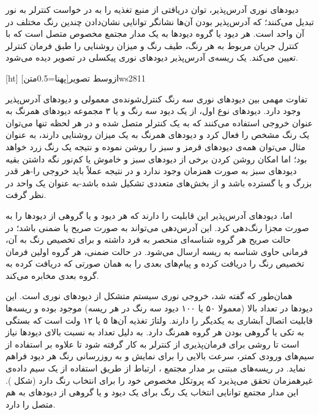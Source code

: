 
دیودهای نوری آدرس‌پذیر، توان دریافتی از منبع تغذیه را به در خواست کنترلر به نور تبدیل می‌کنند؛ که آدرس‌پذیر بودن آن‌ها نشانگر توانایی نشان‌دادن چندین رنگ مختلف در آن واحد است. هر دیود یا گروه دیودها به یک مدار مجتمع مخصوص متصل است که با کنترل جریان مربوط به هر رنگ، طیف رنگ و میزان روشنایی را طبق فرمان کنترلر تعیین می‌کند. یک ریسه‌ی آدرس‌پذیر دیودهای نوری پیکسلی در تصویر  دیده می‌شود.

[ht]
‌ازوسط
‌تصویر[پهنا=0.5‌متن]{ws2811}

تفاوت مهمی بین دیودهای نوری سه رنگ کنترل‌شونده‌ی معمولی و دیودهای آدرس‌پذیر وجود دارد. دیودهای نوع اول، از یک دیود سه رنگ و یا ۳ مجموعه دیودهای همرنگ به عنوان خروجی استفاده می‌کنند که به یک کنترلر متصل شده و در هر لحظه تنها می‌توان یک رنگ مشخص را فعال کرد و دیودهای همرنگ به یک میزان روشنایی دارند، به عنوان مثال می‌توان همه‌ی دیودهای قرمز و سبز را روشن نموده و نتیجه یک رنگ زرد خواهد بود؛ اما امکان روشن کردن برخی از دیود‌های سبز و خاموش یا کم‌نور نگه داشتن بقیه دیودهای سبز به صورت همزمان وجود ندارد و در نتیجه عملاً باید خروجی را-هر قدر بزرگ و یا گسترده باشد و از بخش‌های متعددی تشکیل شده باشد-به عنوان یک واحد در نظر گرفت.

اما، دیودهای آدرس‌پذیر این قابلیت را دارند که هر دیود و یا گروهی از دیود‌ها را به صورت مجزا رنگ‌دهی کرد. این آدرس‌دهی می‌تواند به صورت صریح یا ضمنی باشد؛ در حالت صریح هر گروه شناسه‌ای منحصر به فرد داشته و برای تخصیص رنگ به آن، فرمانی حاوی شناسه به ریسه ارسال می‌شود. در حالت ضمنی، هر گروه اولین فرمان تخصیص رنگ را دریافت کرده و پیام‌های بعدی را به همان صورتی که دریافت کرده به گروه بعدی مخابره می‌کند.


همان‌طور که گفته شد، خروجی نوری سیستم متشکل از دیودهای نوری است. این دیودها در تعداد بالا (معمولا  ۵۰ یا ۱۰۰ دیود سه رنگ در هر ریسه) موجود بوده و ریسه‌ها قابلیت اتصال آبشاری به یکدیگر را دارند. ولتاژ تغذیه آن‌ها ۵ یا ۱۲ ولت است که بستگی به تکی یا گروهی بودن هر گروه همرنگ دارد. به دلیل تعداد به نسبت بالای دیودها نیاز است تا روشی برای فرمان‌پذیری از کنترلر به کار گرفته شود تا علاوه بر استفاده از سیم‌های ورودی کمتر، سرعت بالایی را برای نمایش و به روزرسانی رنگ هر دیود فراهم نماید. در ریسه‌های مبتنی بر مدار مجتمع ، ارتباط از طریق استفاده از یک سیم داده‌ی غیرهمزمان تحقق می‌پذیرد که پروتکل مخصوص خود را برای انتخاب رنگ دارد (شکل  ). این مدار مجتمع توانایی انتخاب یک رنگ برای یک دیود و یا گروهی از دیودهای به هم متصل را دارد.


